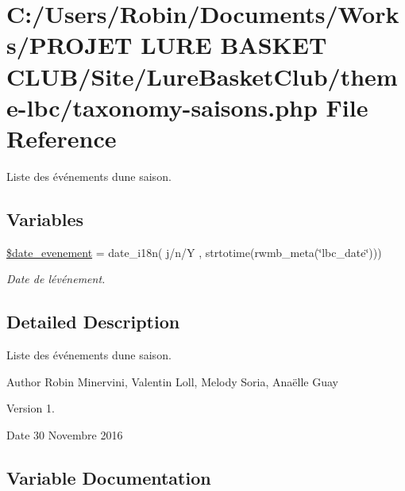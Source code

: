\hypertarget{taxonomy-saisons_8php}{}\section{C\+:/\+Users/\+Robin/\+Documents/\+Works/\+P\+R\+O\+J\+ET L\+U\+RE B\+A\+S\+K\+ET C\+L\+U\+B/\+Site/\+Lure\+Basket\+Club/theme-\/lbc/taxonomy-\/saisons.php File Reference}
\label{taxonomy-saisons_8php}


Liste des événements d\textquotesingle{}une saison.  


\subsection*{Variables}
\begin{DoxyCompactItemize}
\item 
\hyperlink{taxonomy-saisons_8php_a11de676b80dcb5be6ec8dc2cfb9617a1}{\$date\+\_\+evenement} = date\+\_\+i18n(\textquotesingle{} j/n/Y \textquotesingle{}, strtotime(rwmb\+\_\+meta(\char`\"{}lbc\+\_\+date\char`\"{})))
\begin{DoxyCompactList}\small\item\em Date de l\textquotesingle{}événement. \end{DoxyCompactList}\end{DoxyCompactItemize}


\subsection{Detailed Description}
Liste des événements d\textquotesingle{}une saison. 

\begin{DoxyAuthor}{Author}
Robin Minervini, Valentin Loll, Melody Soria, Anaëlle Guay 
\end{DoxyAuthor}
\begin{DoxyVersion}{Version}
1. 
\end{DoxyVersion}
\begin{DoxyDate}{Date}
30 Novembre 2016 
\end{DoxyDate}


\subsection{Variable Documentation}
\hypertarget{taxonomy-saisons_8php_a11de676b80dcb5be6ec8dc2cfb9617a1}{}\label{taxonomy-saisons_8php_a11de676b80dcb5be6ec8dc2cfb9617a1} 

